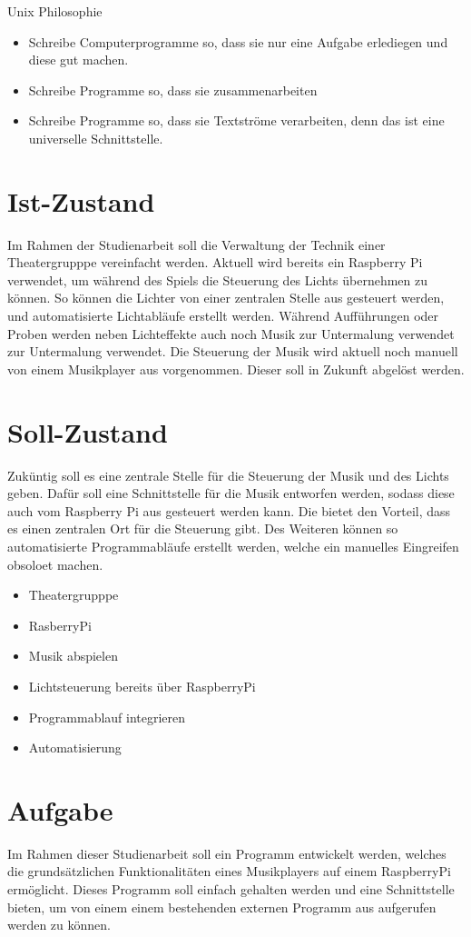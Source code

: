 Unix Philosophie
\begin{itemize}
\item Schreibe Computerprogramme so, dass sie nur eine Aufgabe erlediegen und
diese gut machen.
\item Schreibe Programme so, dass sie zusammenarbeiten
\item Schreibe Programme so, dass sie Textströme verarbeiten, denn das ist eine
universelle Schnittstelle.
\end{itemize}


\section{Ist-Zustand}
Im Rahmen der Studienarbeit soll die Verwaltung der Technik einer
Theatergrupppe vereinfacht werden. Aktuell wird bereits ein Raspberry Pi
verwendet, um während des Spiels die Steuerung des Lichts übernehmen
zu können. So können die Lichter von einer zentralen Stelle aus gesteuert
werden, und automatisierte Lichtabläufe erstellt werden. Während Aufführungen
oder Proben werden neben Lichteffekte auch noch Musik zur Untermalung verwendet
zur Untermalung verwendet. Die Steuerung der Musik wird aktuell noch manuell
von einem Musikplayer aus vorgenommen. Dieser soll in Zukunft abgelöst werden.

\section{Soll-Zustand}
Zuküntig soll es eine zentrale Stelle für die Steuerung der Musik und des
Lichts geben. Dafür soll eine Schnittstelle für die Musik entworfen werden,
sodass diese auch vom Raspberry Pi aus gesteuert werden kann. Die bietet den
Vorteil, dass es einen zentralen Ort für die Steuerung gibt. Des Weiteren
können so automatisierte Programmabläufe erstellt werden, welche ein manuelles
Eingreifen obsoloet machen.

\begin{itemize}
\item Theatergrupppe
\item RasberryPi
\item Musik abspielen
\item Lichtsteuerung bereits über RaspberryPi
\item Programmablauf integrieren
\item Automatisierung
\end{itemize}

\section{Aufgabe}
Im Rahmen dieser Studienarbeit soll ein Programm entwickelt werden, welches
die grundsätzlichen Funktionalitäten eines Musikplayers auf einem RaspberryPi
ermöglicht. Dieses Programm soll einfach gehalten werden und eine Schnittstelle
bieten, um von einem einem bestehenden externen Programm aus aufgerufen werden
zu können. 
